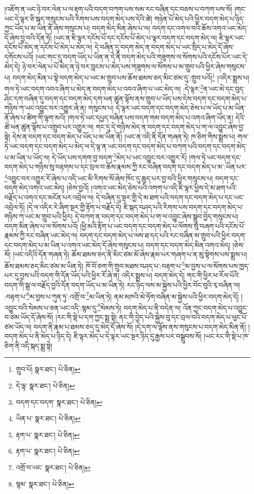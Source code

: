 །འཇོག་ན་ཡང་ཉེ་བར་ལེན་པ་ལ་རྟག་པའི་བདག་བཀག་པས་སམ་རང་བཞིན་དང་བཅས་པ་བཀག་པས་སོ། །གང་ཡང་དེ་ལྟར་ཅི་སྐད་གསུངས་པའི་རིགས་པས་བདག་མེད་པས་དེའི་ཚེ། གཉེན་པོ་མེད་པའི་ཕྱིར་བདག་མེད་པ་ཉིད་ཀྱང་ཡོད་པ་མ་ཡིན་ནོ་ཞེས་གསུངས་པ། བདག་མེད་མིན་ཞེས་པ་ལ། བདག་དང་འགལ་བའི་ཆོས་འགའ་ཡང་མེད་དོ་ཞེས་བྱ་བའི་དོན་ཏོ། །ཡང་ན་ཇི་ལྟར་དངོས་པོ་དང་དངོས་པོ་མེད་པ་ལྟར་བདག་དང་བདག་མེད་ལ། ཇི་ལྟར་ཡང་དངོས་པོ་མེད་ན་དངོས་པོ་མེད་པ་མེད་ལ། དེ་བཞིན་དུ་བདག་མེད་ན་བདག་མེད་པ་ཡང་སྲིད་པ་མེད་དོ་ཞེས་དགོངས་པའོ། །ཡང་གང་དུ་བདག་ཡོད་པ་ཡིན་ན་དེ་ནི་བདག་མེད་པའི་གཟུགས་ལ་སོགས་པའི་དངོས་པོར་ཡང་དེ་མེད་དེ། ཉེ་བར་ལེན་པ་པོ་མེད་ན་ཉེ་བར་བླངས་པ་མེད་པས་གཟུགས་ལ་སོགས་པ་མ་གྲུབ་པའི་ཕྱིར་ཞེས་གསུངས་པ། བདག་མེད་མིན་པ་སྟེ་བདག་མེད་པ་ཡང་མ་གྲུབ་པས་ཆོས་ཐམས་ཅད་མིང་ཙམ་དུ་:གྲུབ་པའོ།\footnote{གྲུབ་པོ།  སྣར་ཐང་།  པེ་ཅིན། } །འདིར་སྨྲས་པ། གལ་ཏེ་ཡང་བདག་འབའ་ཞིག་པ་མེད་ན་བདག་མེད་པ་འབའ་ཞིག་པ་ཡང་མེད་ལ། :དེ་ལྟར་\footnote{དེ་ལྟ་  སྣར་ཐང་།  པེ་ཅིན། }ན་ཡང་མེ་དང་བུད་ཤིང་དག་བཞིན་དུ་བདག་དང་བདག་མེད་དག་ཕན་ཚུན་ལྟོས་ནས་གྲུབ་པ་ཡོད་པས་དེས་བདག་དང་བདག་མེད་པ་གཉིས་ཀ་ཡང་འབྱུང་བར་འགྱུར་ཞེ་ན། གསུངས་པ། དེ་ལྟར་ཡང་བདག་དང་བདག་མེད་ཅེས་པ་ལ་ཡོད་པ་མ་ཡིན་ནོ་ཞེས་པ་ཚིག་གི་ལྷག་མའོ། །གལ་ཏེ་ཡང་དཔྱད་བཞིན་པས་བདག་གམ་བདག་མེད་པ་འགའ་ཞིག་ཡོད་ན། དེའི་ཚེ་ཕན་ཚུན་ལྟོས་པ་འགྲུབ་པར་འགྱུར་ལ། གང་དུ་དེ་གཉིས་མེད་ན་བདག་དང་བདག་མེད་པ་ག་ལ་འབྱུང་ཞེས་བྱ་སྟེ། དེས་ན་བདག་དང་བདག་མེད་པ་ཡོད་པ་མ་ཡིན་ནོ། །ཡང་ན་འདི་ནི་དོན་གཞན་ཏེ། ཁ་ཅིག་གིས་སྨྲས་པ། གལ་ཏེ་ཡང་བདག་དང་བདག་མེད་པ་མེད་ལ་དེ་ལྟ་ན་ཡང་བདག་དང་བདག་མེད་པ་བཀག་པའི་བདག་དང་བདག་མེད་པ་མ་ཡིན་པ་ཡོད་ལ། དེ་ཡོད་པས་དགག་བྱ་བདག་\footnote{བདག་དང་བདག་  སྣར་ཐང་།  པེ་ཅིན། }མེད་པ་ཡང་འབྱུང་བར་འགྱུར་རོ། །གལ་ཏེ་ཡང་བདག་དང་བདག་མེད་པ་གཉིས་སུ་བརྟགས་པ་དང་བྲལ་བ་ཆོས་རྣམས་ཀྱི་རང་བཞིན་བདག་དང་བདག་མེད་པ་མ་:ཡིན་པར་\footnote{ཡིན་པ་  སྣར་ཐང་།  པེ་ཅིན། }འབྱུང་བར་འགྱུར་རོ་ཞེས་པ་འདི་ཡང་མི་རིགས་སོ་ཞེས་ཁོང་དུ་ཆུད་པར་བྱ་བའི་ཕྱིར་གསུངས་པ། བདག་དང་བདག་མེད་འགའ་ཡང་མེད། །ཅེས་བྱའོ། །འགའ་ཡང་མེད་ཅེས་པའི་འགག་པ་འདི་ཇི་ལྟར་ཕྱིས་དེ་མ་ཐག་པའི་བརྗོད་པ་འགའ་དང་མངོན་པར་འབྲེལ་ལ། དེ་བཞིན་དུ་སྔར་གྱི་དེ་མ་ཐག་པའི་བདག་དང་བདག་མེད་པ་དང་ཡང་འབྲེལ་ཏོ། །དེ་ལ་འདིར་རེ་ཞིག་སྔར་གྱི་རྟོག་པ་བརྗོད་དེ། ཇི་སྐད་བཤད་པའི་རིགས་པས་བདག་དང་བདག་མེད་པ་གཉིས་ཀ་ཡང་མ་གྲུབ་པའི་ཕྱིར། དེ་བཀག་ན་བདག་དང་བདག་མེད་པ་ག་ལ་འབྱུང་ཞེས་སྒྲུབ་བྱེད་གསུངས་པ། བདག་མིན་ཞེས་པ་ལ་སོགས་པའོ། །ཕྱི་མའི་རྟོག་པ་ཡང་བདག་དང་བདག་མེད་པ་ལོགས་སུ་བཞག་པའི་དངོས་པོ་རྣམས་ཀྱི་རང་བཞིན་ཡང་མེད་ལ། བདག་དང་བདག་མེད་པ་ལས་ཐ་དད་པའི་རང་བཞིན་མ་གྲུབ་པའི་ཕྱིར་བདག་དང་བདག་མེད་པ་མ་ཡིན་པ་འགའ་ཡང་མེད་དོ་ཞེས་གསུངས་པ། བདག་དང་བདག་མེད་མིན་འགའ་མེད། །ཅེས་སོ། །ཡང་འདིའི་དོན་གཞན་ཏེ། ཆོས་ཐམས་ཅད་ནི་མིང་ཙམ་མོ་ཞེས་རྣམ་པར་གཞག་པ་ན་མུ་སྟེགས་པས་སྨྲས་པ། ཆོས་ཐམས་ཅད་མིང་ཙམ་མ་ཡིན་ཏེ། ཁོ་བོ་ཅག་གི་གྲུབ་མཐས་བཤད་པ་:བརྟག་པ་\footnote{རྟག་པ་  སྣར་ཐང་།  པེ་ཅིན། }མ་བྱས་པ་ལ་སོགས་པས་ཁྱད་པར་དུ་བྱས་པའི་བདག་གི་དོན་ཡོད་པའི་ཕྱིར་རོ་ཞེ་ན། འདིར་སྨྲས་པ། བདག་མེད་དེ། གང་གི་ཕྱིར་ཕ་རོལ་པོའི་བདག་གི་སྒྲ་ལ་བརྗོད་བྱའི་དོན་བདག་ཡོད་པ་མ་ཡིན་ཏེ། རང་ཉིད་ལས་མ་སྐྱེས་པའི་ཕྱིར་བོང་བུའི་རྭ་བཞིན་ལ། :བརྟག་པ་\footnote{རྟག་པ་  སྣར་ཐང་།  པེ་ཅིན། }མ་བྱས་པ་ཀུན་ཏུ་:འགྲོ་བ་\footnote{འགྲོ་བ་ཡང་  སྣར་ཐང་།  པེ་ཅིན། }མ་ཡིན་ཏེ། ནམ་མཁའི་མེ་ཏོག་བཞིན་མ་སྐྱེས་པའི་ཕྱིར་བདག་མེད་དོ། །འབྱུང་བའི་སེམས་པ་ཅན་ཡང་འདི་:སྙམ་དུ་\footnote{སྙམ་  སྣར་ཐང་།  པེ་ཅིན། }སེམས་ཏེ། བདག་མེད་པ་ནི་བདེན་ལ། འོན་ཀྱང་བདག་མེད་པ་འབྱུང་བ་ཙམ་ཡོད་དོ་ཞེས་སོ། །རང་གི་སྡེ་པ་དག་ཀྱང་སྨྲ་སྟེ། ནང་གི་བྱེད་པའི་སྐྱེས་བུ་དང་བྲལ་བའི་བདག་མེད་པ་ཕུང་པོ་ཙམ་ཡོད་ལ། བདག་ནི་རྣམ་པ་ཐམས་ཅད་དུ་མེད་དོ་ཞེས་སོ། །དེ་དག་ལ་ལྟོས་ནས་གསུངས་པ་བདག་མེད་མིན་ནོ། །བདག་མེད་པ་ནི་མེད་པ་ཉིད་དེ། ཇི་ལྟར་མེད་པ་དེ་ལྟར་ཡང་སྔར་ཉིད་དུ་རྒྱས་པར་བསྒྲུབས་སོ། །ཡང་རང་གི་སྡེ་པ་ཁ་ཅིག་ནི་འདི་སྐད་སྨྲ་སྟེ། 